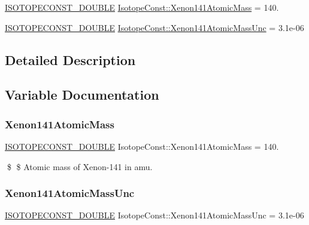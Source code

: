 \begin{DoxyCompactItemize}
\item 
\mbox{\hyperlink{group___isotope_const-_macros_ga8f45a7272ce02c0b4c65c44636ed719a}{I\+S\+O\+T\+O\+P\+E\+C\+O\+N\+S\+T\+\_\+\+D\+O\+U\+B\+LE}} \mbox{\hyperlink{group___isotope_const-_xenon-_xe141_ga84bc982312522ff0717341cf167564f9}{Isotope\+Const\+::\+Xenon141\+Atomic\+Mass}} = 140.
\item 
\mbox{\hyperlink{group___isotope_const-_macros_ga8f45a7272ce02c0b4c65c44636ed719a}{I\+S\+O\+T\+O\+P\+E\+C\+O\+N\+S\+T\+\_\+\+D\+O\+U\+B\+LE}} \mbox{\hyperlink{group___isotope_const-_xenon-_xe141_ga4bbc0274a537cd1dbe4fc1df77ef2a1a}{Isotope\+Const\+::\+Xenon141\+Atomic\+Mass\+Unc}} = 3.\+1e-\/06
\end{DoxyCompactItemize}


\subsection{Detailed Description}


\subsection{Variable Documentation}
\mbox{\label{group___isotope_const-_xenon-_xe141_ga84bc982312522ff0717341cf167564f9}} 
\subsubsection{\texorpdfstring{Xenon141\+Atomic\+Mass}{Xenon141AtomicMass}}
{\footnotesize\ttfamily \mbox{\hyperlink{group___isotope_const-_macros_ga8f45a7272ce02c0b4c65c44636ed719a}{I\+S\+O\+T\+O\+P\+E\+C\+O\+N\+S\+T\+\_\+\+D\+O\+U\+B\+LE}} Isotope\+Const\+::\+Xenon141\+Atomic\+Mass = 140.}

\$ \$ Atomic mass of Xenon-\/141 in amu. \mbox{\label{group___isotope_const-_xenon-_xe141_ga4bbc0274a537cd1dbe4fc1df77ef2a1a}} 
\subsubsection{\texorpdfstring{Xenon141\+Atomic\+Mass\+Unc}{Xenon141AtomicMassUnc}}
{\footnotesize\ttfamily \mbox{\hyperlink{group___isotope_const-_macros_ga8f45a7272ce02c0b4c65c44636ed719a}{I\+S\+O\+T\+O\+P\+E\+C\+O\+N\+S\+T\+\_\+\+D\+O\+U\+B\+LE}} Isotope\+Const\+::\+Xenon141\+Atomic\+Mass\+Unc = 3.\+1e-\/06}

